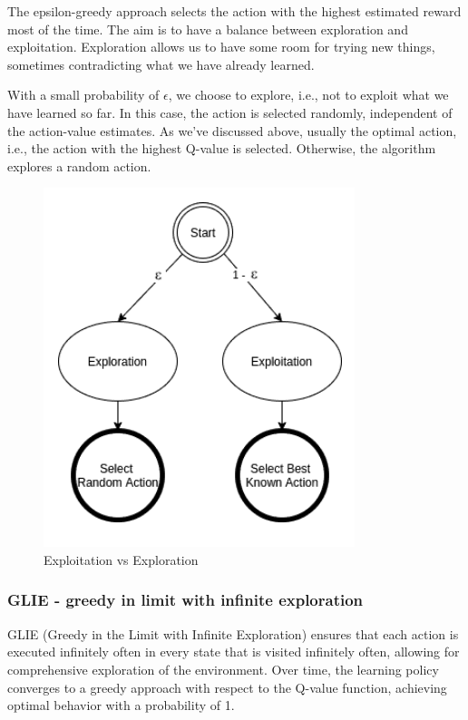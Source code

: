 \documentclass{article}
\begin{document}
The epsilon-greedy approach selects the action with the highest estimated reward most of the time. The aim is to have a balance between exploration and exploitation. Exploration allows us to have some room for trying new things, sometimes contradicting what we have already learned.  

With a small probability of $\epsilon$, we choose to explore, i.e., not to exploit what we have learned so far. In this case, the action is selected randomly, independent of the action-value estimates.
As we’ve discussed above, usually the optimal action, i.e., the action with the highest Q-value is selected. Otherwise, the algorithm explores a random action.

\begin{figure}[h]
	\centering
	\includegraphics[width=0.5\linewidth]{../data/images/exp_e.png}
	\caption{Exploitation vs Exploration \cite{q_le}}
	\label{fig:expl}
\end{figure}

\subsubsection{GLIE - greedy in limit with infinite exploration}
GLIE (Greedy in the Limit with Infinite Exploration) ensures that each action is executed infinitely often in every state that is visited infinitely often, allowing for comprehensive exploration of the environment. Over time, the learning policy converges to a greedy approach with respect to the Q-value function, achieving optimal behavior with a probability of 1.

\end{document}
